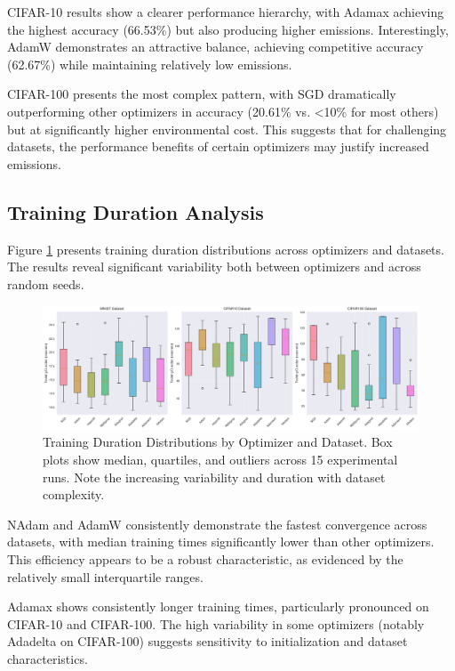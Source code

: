 \documentclass[conference]{IEEEtran}
\begin{document}
CIFAR-10 results show a clearer performance hierarchy, with Adamax achieving the highest accuracy (66.53\%) but also producing higher emissions. Interestingly, AdamW demonstrates an attractive balance, achieving competitive accuracy (62.67\%) while maintaining relatively low emissions.

CIFAR-100 presents the most complex pattern, with SGD dramatically outperforming other optimizers in accuracy (20.61\% vs. <10\% for most others) but at significantly higher environmental cost. This suggests that for challenging datasets, the performance benefits of certain optimizers may justify increased emissions.

\subsection{Training Duration Analysis}

Figure \ref{fig:training_duration} presents training duration distributions across optimizers and datasets. The results reveal significant variability both between optimizers and across random seeds.

\begin{figure}[htbp]
\centering
\includegraphics[width=\textwidth]{../results/plots/training_duration_boxplots.png}
\caption{Training Duration Distributions by Optimizer and Dataset. Box plots show median, quartiles, and outliers across 15 experimental runs. Note the increasing variability and duration with dataset complexity.}
\label{fig:training_duration}
\end{figure}

NAdam and AdamW consistently demonstrate the fastest convergence across datasets, with median training times significantly lower than other optimizers. This efficiency appears to be a robust characteristic, as evidenced by the relatively small interquartile ranges.

Adamax shows consistently longer training times, particularly pronounced on CIFAR-10 and CIFAR-100. The high variability in some optimizers (notably Adadelta on CIFAR-100) suggests sensitivity to initialization and dataset characteristics.
\end{document}
